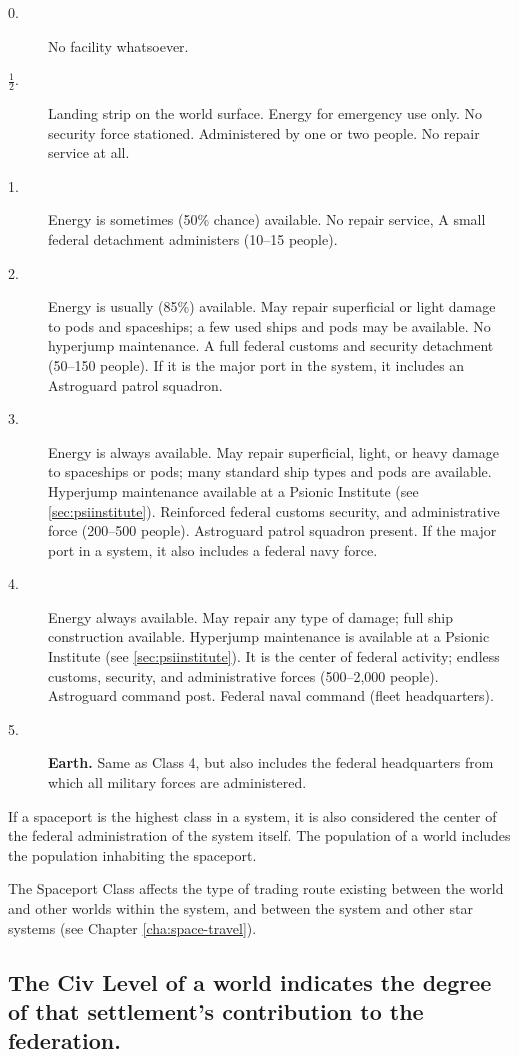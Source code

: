 \begin{description}
\item[0.] No facility whatsoever.
\item[$\frac12$.] Landing strip on the world surface. Energy for
  emergency use only. No security force stationed. Administered by one
  or two people. No repair service at all.
\item[1.] Energy is sometimes (50\% chance) available. No repair
  service, A small federal detachment administers (10--15 people).
\item[2.] Energy is usually (85\%) available. May repair superficial
  or light damage to pods and spaceships; a few used ships and pods
  may be available. No hyperjump maintenance. A full federal customs
  and security detachment (50--150 people). If it is the major port in
  the system, it includes an Astroguard patrol squadron.
\item[3.] Energy is always available. May repair superficial, light,
  or heavy damage to spaceships or pods; many standard ship types and
  pods are available. Hyperjump maintenance available at a Psionic
  Institute (see \ref{sec:psiinstitute}). Reinforced federal customs
  security, and 
  administrative force (200--500 people). Astroguard patrol squadron
  present. If the major port in a system, it also includes a federal
  navy force.
\item[4.] Energy always available. May repair any type of damage; full
  ship construction available. Hyperjump maintenance is available at a
  Psionic Institute (see \ref{sec:psiinstitute}). It is the center of
  federal activity; endless customs, security, and administrative
  forces (500--2,000 people).  Astroguard command post. Federal naval
  command (fleet headquarters).
\item[5.] \textbf{Earth.} Same as Class 4, but also includes the
  federal headquarters from which all military forces are
  administered.
\end{description}

If a spaceport is the highest class in a system, it is also considered
the center of the federal administration of the system itself. The
population of a world includes the population inhabiting the
spaceport.

The Spaceport Class affects the type of trading route existing between
the world and other worlds within the system, and between the system
and other star systems (see Chapter \ref{cha:space-travel}).

\subsection[Civ Level]{The Civ Level of a world indicates the degree
  of that settlement's contribution to the federation.}
\label{sec:civ-level}


